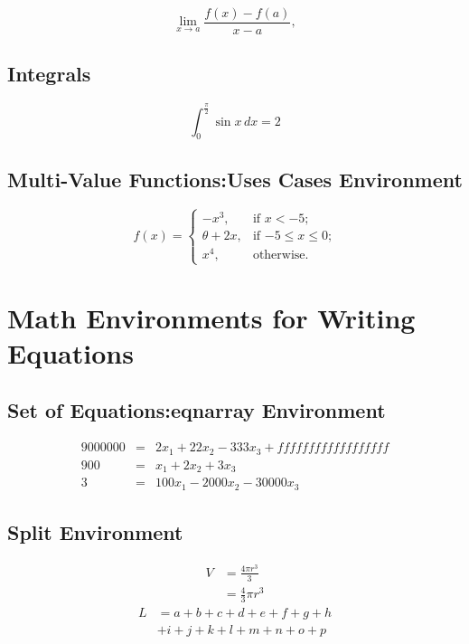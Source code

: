 \documentclass{article}
\begin{document}
	\[
	\lim_{x \to a} \frac{f(x) - f(a)}{x - a},
	\]
	
	\subsection{Integrals}
	\[
	\int_{0}^{\frac{\pi}{2}} \sin x \, dx = 2 \tag{Any Tag you Want}
	\]
	
	
	
	\subsection{Multi-Value Functions:Uses Cases Environment}
	\[
	f(x)=
	\begin{cases}
	-x^{3}, &\text{if $x < -5$;}\\
	\theta + 2x, &\text{if $-5 \leq x \leq 0$;}\\
	x^{4}, &\text{otherwise.}
	\end{cases}
	\]
	
	\section{Math Environments for Writing Equations}
	\subsection{Set of Equations:eqnarray Environment}
	\begin{eqnarray}
	9000000&=&2x_1+22x_2-333x_3+ ffffffffffffffffff\\
	900&=&x_1+2x_2+3x_3\\
	3&=&100x_1-2000x_2-30000x_3
	\end{eqnarray}
	
	\subsection{Split Environment}
	\begin{equation} \label{eq1}
	\begin{split}
	V& = \frac{4\pi r^3}{3} \\
	& = \frac{4}{3} \pi r^3
	\end{split}
	\end{equation}
	\begin{equation} \label{eq1}
	\begin{split}
	L& =a+b+c+d+e+f+g+h \\
	&+i+j+k+l+m+n+o+p
	\end{split}
	\end{equation}
	
\end{document}
